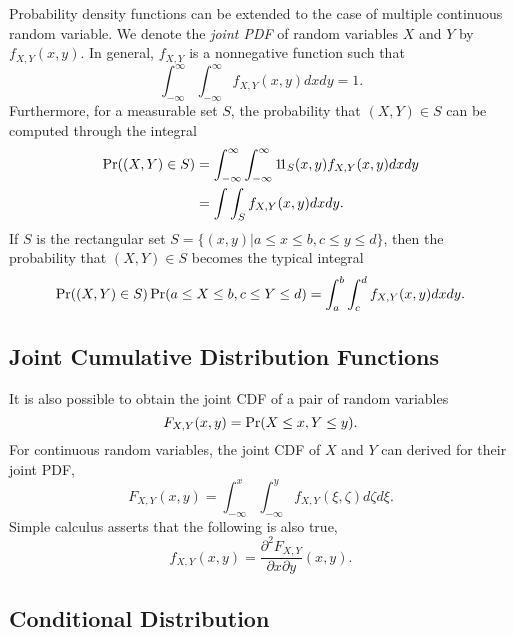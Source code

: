 Probability density functions can be extended to the case of multiple continuous random variable.
We denote the \emph{joint PDF} of random variables $X$ and $Y$ by $f_{X,Y} (x, y)$.
In general, $f_{X,Y}$ is a nonnegative function such that
\begin{equation*}
\int_{-\infty}^{\infty} \int_{-\infty}^{\infty}
f_{X, Y} (x, y) dx dy = 1.
\end{equation*}
Furthermore, for a measurable set $S$, the probability that $(X,Y) \in S$ can be computed through the integral
\begin{equation*}
\begin{split}
\Pr ((X,Y) \in S)
&= \int_{-\infty}^{\infty} \int_{-\infty}^{\infty}
\mathrm{1\!1}_{S}(x,y) f_{X, Y} (x, y) dx dy \\
&= \int \int_{S}
f_{X, Y} (x, y) dx dy .
\end{split}
\end{equation*}
If $S$ is the rectangular set $S = \{ (x,y) | a \leq x \leq b, c \leq y \leq d \}$, then the probability that $(X,Y) \in S$ becomes the typical integral
\begin{equation*}
\Pr ((X,Y) \in S)
\Pr (a \leq X \leq b, c \leq Y \leq d)
= \int_{a}^{b} \int_{c}^{d}
f_{X, Y} (x, y) dx dy .
\end{equation*}

\begin{example}
\end{example}

\subsection{Joint Cumulative Distribution Functions}

It is also possible to obtain the joint CDF of a pair of random variables
\begin{equation*}
F_{X,Y} (x,y) = \Pr (X \leq x, Y \leq y) .
\end{equation*}
For continuous random variables, the joint CDF of $X$ and $Y$ can derived for their joint PDF,
\begin{equation*}
F_{X,Y} (x,y) = \int_{-\infty}^x \int_{-\infty}^y f_{X,Y} (\xi,\zeta) d\zeta d\xi .
\end{equation*}
Simple calculus asserts that the following is also true,
\begin{equation*}
f_{X,Y} (x,y) = \frac{\partial^2 F_{X,Y}}{\partial x \partial y} (x,y) .
\end{equation*}

\subsection{Conditional Distribution}

